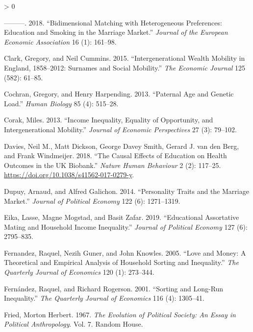 \documentclass[
]{article}
\newlength{\cslhangindent}
\newenvironment{CSLReferences}[2] %
 {%
  \setlength{\parindent}{0pt}
  \ifodd #1 \everypar{\setlength{\hangindent}{\cslhangindent}}\ignorespaces\fi
  \ifnum #2 > 0
  \setlength{\parskip}{#2\baselineskip}
  \fi
 }%
 {}
\begin{document}
\begin{CSLReferences}{1}{0}
\leavevmode\hypertarget{ref-chiappori2018bidimensional}{}%
---------. 2018. {``Bidimensional Matching with Heterogeneous Preferences: Education and Smoking in the Marriage Market.''} \emph{Journal of the European Economic Association} 16 (1): 161--98.

\leavevmode\hypertarget{ref-clark2015intergenerational}{}%
Clark, Gregory, and Neil Cummins. 2015. {``Intergenerational Wealth Mobility in England, 1858--2012: Surnames and Social Mobility.''} \emph{The Economic Journal} 125 (582): 61--85.

\leavevmode\hypertarget{ref-cochran2013paternal}{}%
Cochran, Gregory, and Henry Harpending. 2013. {``Paternal Age and Genetic Load.''} \emph{Human Biology} 85 (4): 515--28.

\leavevmode\hypertarget{ref-corak2013income}{}%
Corak, Miles. 2013. {``Income Inequality, Equality of Opportunity, and Intergenerational Mobility.''} \emph{Journal of Economic Perspectives} 27 (3): 79--102.

\leavevmode\hypertarget{ref-Davies_2018}{}%
Davies, Neil M., Matt Dickson, George Davey Smith, Gerard J. van den Berg, and Frank Windmeijer. 2018. {``The Causal Effects of Education on Health Outcomes in the {UK} Biobank.''} \emph{Nature Human Behaviour} 2 (2): 117--25. \url{https://doi.org/10.1038/s41562-017-0279-y}.

\leavevmode\hypertarget{ref-dupuy2014personality}{}%
Dupuy, Arnaud, and Alfred Galichon. 2014. {``Personality Traits and the Marriage Market.''} \emph{Journal of Political Economy} 122 (6): 1271--1319.

\leavevmode\hypertarget{ref-eika2019educational}{}%
Eika, Lasse, Magne Mogstad, and Basit Zafar. 2019. {``Educational Assortative Mating and Household Income Inequality.''} \emph{Journal of Political Economy} 127 (6): 2795--835.

\leavevmode\hypertarget{ref-fernandez2005love}{}%
Fernandez, Raquel, Nezih Guner, and John Knowles. 2005. {``Love and Money: A Theoretical and Empirical Analysis of Household Sorting and Inequality.''} \emph{The Quarterly Journal of Economics} 120 (1): 273--344.

\leavevmode\hypertarget{ref-fernandez2001sorting}{}%
Fernández, Raquel, and Richard Rogerson. 2001. {``Sorting and Long-Run Inequality.''} \emph{The Quarterly Journal of Economics} 116 (4): 1305--41.

\leavevmode\hypertarget{ref-fried1967evolution}{}%
Fried, Morton Herbert. 1967. \emph{The Evolution of Political Society: An Essay in Political Anthropology}. Vol. 7. Random House.


\end{CSLReferences}
\end{document}
